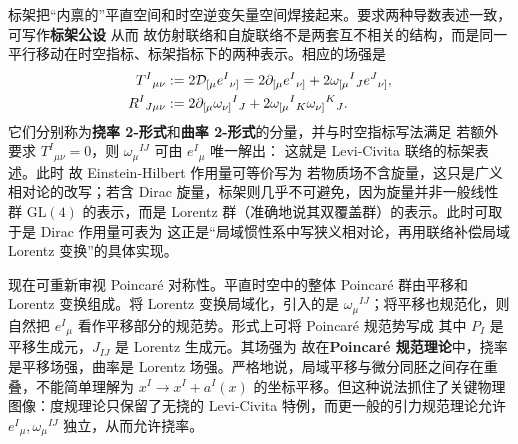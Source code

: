 标架把“内禀的”平直空间和时空逆变矢量空间焊接起来。要求两种导数表述一致，可写作\textbf{标架公设}
从而
故仿射联络和自旋联络不是两套互不相关的结构，而是同一平行移动在时空指标、标架指标下的两种表示。相应的场强是
\begin{align}
    T^I{}_{\mu\nu}&:=2\mathcal D_{[\mu}e^I{}_{\nu]}
    =2\partial_{[\mu}e^I{}_{\nu]}+2\omega_{[\mu}{}^I{}_J e^J{}_{\nu]},\\
    R^I{}_{J\mu\nu}&:=2\partial_{[\mu}\omega_{\nu]}{}^I{}_J
    +2\omega_{[\mu}{}^I{}_K\omega_{\nu]}{}^K{}_J.
\end{align}
它们分别称为\textbf{挠率 2-形式}和\textbf{曲率 2-形式}的分量，并与时空指标写法满足
若额外要求 $T^I{}_{\mu\nu}=0$，则 $\omega_\mu{}^{IJ}$ 可由 $e^I{}_\mu$ 唯一解出：
这就是 Levi-Civita 联络的标架表述。此时
故 Einstein-Hilbert 作用量可等价写为
若物质场不含旋量，这只是广义相对论的改写；若含 Dirac 旋量，标架则几乎不可避免，因为旋量并非一般线性群 GL$(4)$ 的表示，而是 Lorentz 群（准确地说其双覆盖群）的表示。此时可取
于是 Dirac 作用量可表为
这正是“局域惯性系中写狭义相对论，再用联络补偿局域 Lorentz 变换”的具体实现。

现在可重新审视 Poincaré 对称性。平直时空中的整体 Poincaré 群由平移和 Lorentz 变换组成。将 Lorentz 变换局域化，引入的是 $\omega_\mu{}^{IJ}$；将平移也规范化，则自然把 $e^I{}_\mu$ 看作平移部分的规范势。形式上可将 Poincaré 规范势写成
其中 $P_I$ 是平移生成元，$J_{IJ}$ 是 Lorentz 生成元。其场强为
故在\textbf{Poincaré 规范理论}中，挠率是平移场强，曲率是 Lorentz 场强。严格地说，局域平移与微分同胚之间存在重叠，不能简单理解为 $x^I\to x^I+a^I(x)$ 的坐标平移。但这种说法抓住了关键物理图像：度规理论只保留了无挠的 Levi-Civita 特例，而更一般的引力规范理论允许 $e^I{}_\mu,\omega_\mu{}^{IJ}$ 独立，从而允许挠率。

